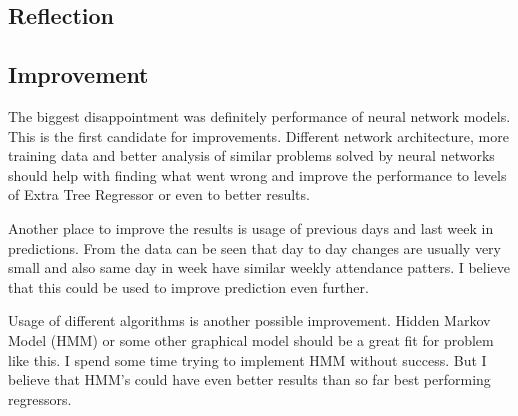 \documentclass{article}
\begin{document}
\subsection{Reflection}

\subsection{Improvement}
The biggest disappointment was definitely performance of neural network models. This is the first candidate for improvements. Different network architecture, more training data and better analysis of similar problems solved by neural networks should help with finding what went wrong and improve the performance to levels of Extra Tree Regressor or even to better results.

Another place to improve the results is usage of previous days and last week in predictions. From the data can be seen that day to day changes are usually very small and also same day in week have similar weekly attendance patters. I believe that this could be used to improve prediction even further. 

Usage of different algorithms is another possible improvement. Hidden Markov Model (HMM) or some other graphical model should be a great fit for problem like this. I spend some time trying to implement HMM without success. But I believe that HMM's could have even better results than so far best performing regressors.



\end{document}
